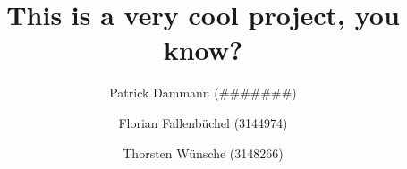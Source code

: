 \documentclass[]{scrreprt}
\title{This is a very cool project, you know?}
\author{Patrick Dammann (\#\#\#\#\#\#\#) \and Florian Fallenbüchel (3144974) \and Thorsten Wünsche (3148266)}
\begin{document}
\maketitle

\begin{abstract}
\end{abstract}

\tableofcontents









\listoffigures

\listoftables
\end{document}
